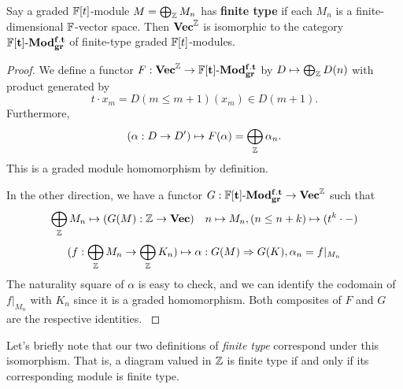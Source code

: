 \begin{lemma}\label{lem:finite-type-cat-isomorphism}
    Say a graded $\mathbb{F}[t]$-module $M=\bigoplus_{\mathbb{Z}} M_n$ has \textbf{finite type} if each $M_n$ is a finite-dimensional $\mathbb{F}$-vector space. Then $\mathbf{Vec}^\mathbb{Z}$ is isomorphic to the category $\mathbf{\mathbb{F}[t]\text{-}Mod^{f.t}_{gr}}$ of finite-type graded $\mathbb{F}[t]$-modules.
\end{lemma}
\begin{proof}
We define a functor $F:\mathbf{Vec}^\mathbb{Z}\rightarrow \mathbf{\mathbb{F}[t]\text{-}Mod^{f.t}_{gr}}$ by $D\mapsto \bigoplus_{\mathbb{Z}} D(n)$ with product generated by $$t\cdot x_m=D(m\leq m+1)(x_m)\in D(m+1).$$ Furthermore, $$(\alpha:D\rightarrow D')\mapsto F(\alpha)=\bigoplus_{\mathbb{Z}} \alpha_n.$$ This is a graded module homomorphism by definition.

In the other direction, we have a functor $G:\mathbf{\mathbb{F}[t]\text{-}Mod^{f.t}_{gr}}\rightarrow \mathbf{Vec}^\mathbb{Z}$ such that $$\bigoplus_{\mathbb{Z}} M_n\mapsto (G(M):\mathbb{Z}\rightarrow \mathbf{Vec}) \quad n\mapsto M_n, (n\leq n+k) \mapsto (t^{k}\cdot -) $$
$$(f:\bigoplus_{\mathbb{Z}} M_n\rightarrow \bigoplus_{\mathbb{Z}} K_n)\mapsto \alpha: G(M)\Rightarrow G(K), \alpha_n=f|_{M_n}$$
The naturality square of $\alpha$ is easy to check, and we can identify the codomain of $f|_{M_n}$ with $K_n$ since it is a graded homomorphism. Both composites of $F$ and $G$ are the respective identities.
\cite{Bubenik2014}
\end{proof}

Let's briefly note that our two definitions of \textit{finite type} correspond under this isomorphism. That is, a diagram valued in $\mathbb{Z}$ is finite type if and only if its corresponding module is finite type.


